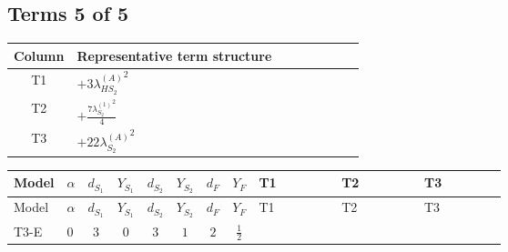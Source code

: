 \documentclass[8pt]{article}
\begin{document}
\begin{landscape}
\subsection*{Terms 5 of 5}
\begin{center}
\begin{tabular}{@{}c >{\raggedright\arraybackslash}p{0.82\linewidth}@{}}
\toprule
Column & Representative term structure \\
\midrule
T1 & \(\displaystyle +3 {\lambda_{HS_2}^{(A)}}^2\) \\
\midrule
T2 & \(\displaystyle +\frac{7 {\lambda_{S_2}^{(1)}}^2}{4}\) \\
\midrule
T3 & \(\displaystyle +22 {\lambda_{S_2}^{(A)}}^2\) \\
\midrule
\bottomrule
\end{tabular}
\end{center}
\smallskip
\tiny
\begin{longtable}{@{}llcccccc >{\raggedright\arraybackslash}p{0.21\linewidth} >{\raggedright\arraybackslash}p{0.21\linewidth} >{\raggedright\arraybackslash}p{0.21\linewidth}@{}}
\toprule
Model & $\alpha$ & $d_{S_1}$ & $Y_{S_1}$ & $d_{S_2}$ & $Y_{S_2}$ & $d_F$ & $Y_F$ & T1 & T2 & T3 \\
\midrule
\endfirsthead
\toprule
Model & $\alpha$ & $d_{S_1}$ & $Y_{S_1}$ & $d_{S_2}$ & $Y_{S_2}$ & $d_F$ & $Y_F$ & T1 & T2 & T3 \\
\midrule
\endhead
T3-E & $0$ & $3$ & $0$ & $3$ & $1$ & $2$ & $\frac{1}{2}$ & \scriptsize\adjustbox{max width=\linewidth}{$\begin{gathered} +3 {\lambda_{HS_2}^{(A)}}^2\end{gathered}$} & \scriptsize\adjustbox{max width=\linewidth}{$\begin{gathered} +\frac{7 {\lambda_{S_2}^{(1)}}^2}{4}\end{gathered}$} & \scriptsize\adjustbox{max width=\linewidth}{$\begin{gathered} +22 {\lambda_{S_2}^{(A)}}^2\end{gathered}$} \\
\midrule
\bottomrule
\end{longtable}
\end{landscape}
\end{document}
